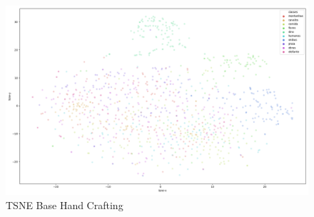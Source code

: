 \documentclass[
article,			%
11pt,				%
oneside,			%
a4paper,			%
english,			%
brazil,				%
sumario=tradicional,
]{abntex2}
\begin{document}
\begin{anexosenv}
	\begin{figure}[htb]
		\caption{\label{tsne-hand-crafting-data}TSNE Base Hand Crafting}
		\begin{center}
			\includegraphics[scale=0.3]{tsne-graph-hand-craft.png}
		\end{center}
	\end{figure}
	
	\end{anexosenv}
	
	
	
\end{document}
